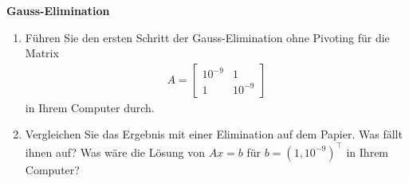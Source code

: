 \textbf{Gauss-Elimination}
\begin{enumerate}
	\item Führen Sie den ersten Schritt der Gauss-Elimination ohne Pivoting für die Matrix 
\begin{align*}
	A = \begin{bmatrix}
	10^{-9} & 1 \\
	1 & 10^{-9}
	\end{bmatrix}
\end{align*}
in Ihrem Computer durch. 
\item Vergleichen Sie das Ergebnis mit einer Elimination auf dem Papier. Was fällt ihnen auf? Was wäre die Lösung von $Ax = b$ für
$b = (1, 10^{-9})^\top$ in Ihrem Computer?
\end{enumerate}